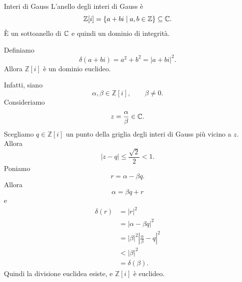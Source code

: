 \documentclass[a4paper]{article}
\begin{document}
\begin{radioactive}
\begin{snippetexample}{Interi di Gauss}
    L'anello degli interi di Gauss è
    \[
        \mathbb{Z}[i]
        =
        \{a+bi\mid a,b\in\mathbb{Z}\}
        \subseteq \mathbb{C}.
    \]
    È un sottoanello di \(\mathbb{C}\) e quindi un dominio di integrità.

    Definiamo
    \[
        \delta(a+bi)=a^2+b^2=|a+bi|^2.
    \]
    Allora \(\mathbb{Z}[i]\) è un dominio euclideo.

    Infatti, siano
    \[
        \alpha,\beta\in\mathbb{Z}[i],
        \qquad
        \beta\neq 0.
    \]
    Consideriamo
    \[
        z=\frac{\alpha}{\beta}\in\mathbb{C}.
    \]
    Scegliamo \(q\in\mathbb{Z}[i]\) un punto della griglia degli interi di Gauss più vicino a \(z\). Allora
    \[
        |z-q|\leq \frac{\sqrt{2}}{2}<1.
    \]
    Poniamo
    \[
        r=\alpha-\beta q.
    \]
    Allora
    \[
        \alpha=\beta q+r
    \]
    e
    \begin{align*}
        \delta(r)
        &=
        |r|^2 \\
        &=
        |\alpha-\beta q|^2 \\
        &=
        |\beta|^2\left|\frac{\alpha}{\beta}-q\right|^2 \\
        &<
        |\beta|^2 \\
        &=
        \delta(\beta).
    \end{align*}
    Quindi la divisione euclidea esiste, e \(\mathbb{Z}[i]\) è euclideo.
    \begin{center}
    \end{center}
\end{snippetexample}
\end{radioactive}
\end{document}

